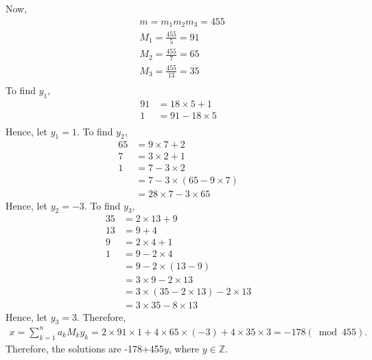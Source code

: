 \documentclass{article}[12pt]
\begin{document}
Now, 
\begin{align*}
&m=m_1m_2m_3=455\\
&M_1=\frac{455}{5}=91\\
&M_2=\frac{455}{7}=65\\
&M_3=\frac{455}{13}=35\\
\end{align*}
To find $y_1$, 
\begin{align*}
91&=18\times 5+1\\
1&=91-18\times 5\\
\end{align*}
Hence, let $y_1=1$. To find $y_2$, 
\begin{align*}
65&=9\times 7+2\\
7&=3\times 2+1\\
1&=7-3\times 2\\
&=7-3\times (65-9\times 7)\\
&=28\times 7-3\times 65
\end{align*}
Hence, let $y_2=-3$. To find $y_3$, 
\begin{align*}
35&=2\times 13+9\\
13&=9+4\\
9&=2\times 4+1\\
1&=9-2\times 4\\
&=9-2\times (13-9)\\
&=3\times 9-2\times 13\\
&=3\times (35-2\times 13)-2\times 13\\
&=3\times 35-8\times 13
\end{align*}
Hence, let $y_3=3$. Therefore, 
\begin{align*}
x=\sum_{k=1}^{n}a_kM_ky_k=2\times 91\times 1+4\times 65\times (-3)+4\times 35\times 3=-178 (\bmod 455). 
\end{align*}
Therefore, the solutions are -178+455$y$, where $y\in \mathbb{Z}$.
\\
\end{document}
